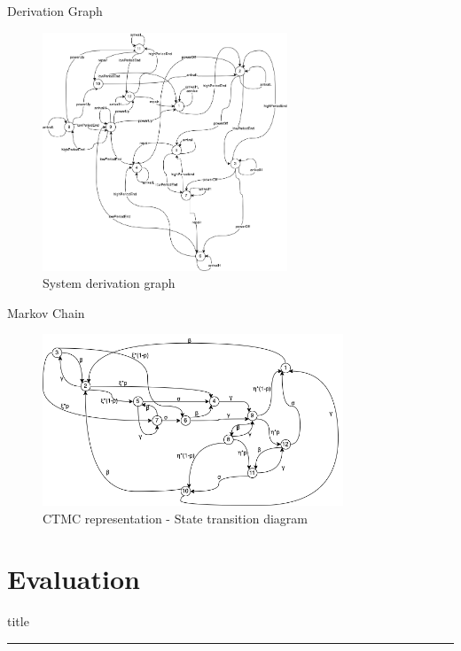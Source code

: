 \documentclass[8pt]{beamer}
\begin{document}
    \begin{frame}{Derivation Graph}
        \begin{figure}[H]
            \centering
            \includegraphics[width=0.65\textwidth]{Images/system-derivation-graph.png}
            \caption{System derivation graph}
            \label{fig:system-derivation-graph}
        \end{figure}
    \end{frame}

    \begin{frame}{Markov Chain}
        \begin{figure}[H]
            \centering
            \includegraphics[width=0.8\textwidth]{Images/CTMC-representation.png}
            \caption{CTMC representation - State transition diagram}
            \label{fig:CTMC-representation}
        \end{figure}
    \end{frame}

\section{Evaluation}
    \begin{frame}[plain]
        \vfill
        \centering
        \begin{beamercolorbox}[sep=8pt,center,shadow=true,rounded=true]{title}
            \insertsectionhead\par
            \color{univered}\noindent\rule{10cm}{1pt} \\
            \LARGE{\faFileTextO}
        \end{beamercolorbox}
        \vfill
    \end{frame}
\end{document}
